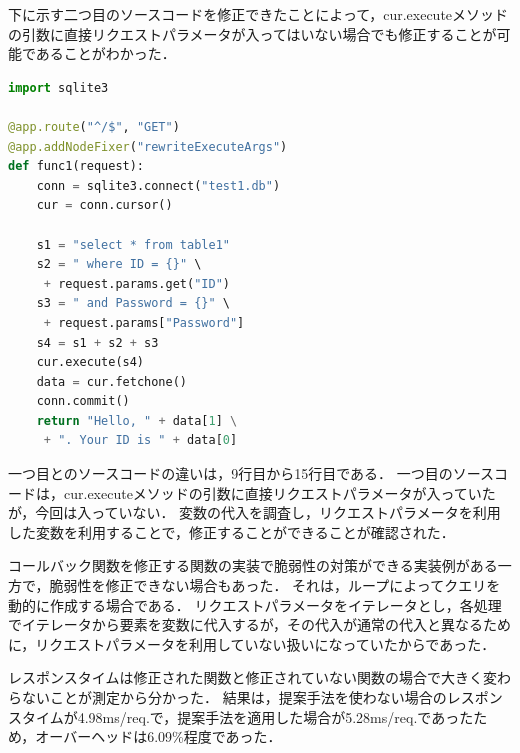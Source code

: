 \documentclass[submit]{ipsj}
\begin{document}
下に示す二つ目のソースコードを修正できたことによって，cur.executeメソッドの引数に直接リクエストパラメータが入ってはいない場合でも修正することが可能であることがわかった．
\begin{lstlisting}[language=python]
import sqlite3

@app.route("^/$", "GET")
@app.addNodeFixer("rewriteExecuteArgs")
def func1(request):
    conn = sqlite3.connect("test1.db")
    cur = conn.cursor()

    s1 = "select * from table1"
    s2 = " where ID = {}" \
     + request.params.get("ID")
    s3 = " and Password = {}" \
     + request.params["Password"]
    s4 = s1 + s2 + s3
    cur.execute(s4)
    data = cur.fetchone()
    conn.commit()
    return "Hello, " + data[1] \
     + ". Your ID is " + data[0]

\end{lstlisting}
一つ目とのソースコードの違いは，9行目から15行目である．
一つ目のソースコードは，cur.executeメソッドの引数に直接リクエストパラメータが入っていたが，今回は入っていない．
変数の代入を調査し，リクエストパラメータを利用した変数を利用することで，修正することができることが確認された．

コールバック関数を修正する関数の実装で脆弱性の対策ができる実装例がある一方で，脆弱性を修正できない場合もあった．
それは，ループによってクエリを動的に作成する場合である．
リクエストパラメータをイテレータとし，各処理でイテレータから要素を変数に代入するが，その代入が通常の代入と異なるために，リクエストパラメータを利用していない扱いになっていたからであった．

レスポンスタイムは修正された関数と修正されていない関数の場合で大きく変わらないことが測定から分かった．
結果は，提案手法を使わない場合のレスポンスタイムが4.98ms/req.で，提案手法を適用した場合が5.28ms/req.であったため，オーバーヘッドは6.09\%程度であった．


\end{document}
